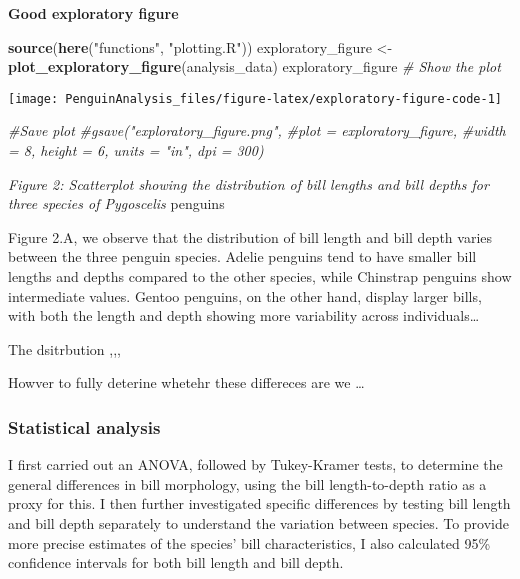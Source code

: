 \documentclass[
]{article}
\newenvironment{Shaded}{\begin{snugshade}}{\end{snugshade}}
\newcommand{\CommentTok}[1]{\textcolor[rgb]{0.56,0.35,0.01}{\textit{#1}}}
\newcommand{\FunctionTok}[1]{\textcolor[rgb]{0.13,0.29,0.53}{\textbf{#1}}}
\newcommand{\NormalTok}[1]{#1}
\newcommand{\OtherTok}[1]{\textcolor[rgb]{0.56,0.35,0.01}{#1}}
\newcommand{\StringTok}[1]{\textcolor[rgb]{0.31,0.60,0.02}{#1}}
\begin{document}
\textbf{Good exploratory figure}

\begin{Shaded}
\begin{Highlighting}[]
\FunctionTok{source}\NormalTok{(}\FunctionTok{here}\NormalTok{(}\StringTok{"functions"}\NormalTok{, }\StringTok{"plotting.R"}\NormalTok{))}
\NormalTok{exploratory\_figure }\OtherTok{\textless{}{-}} \FunctionTok{plot\_exploratory\_figure}\NormalTok{(analysis\_data)}
\NormalTok{exploratory\_figure }\CommentTok{\# Show the plot}
\end{Highlighting}
\end{Shaded}

\begin{center}\texttt{[image: PenguinAnalysis\_files/figure-latex/exploratory-figure-code-1]} \end{center}

\begin{Shaded}
\begin{Highlighting}[]
\CommentTok{\#Save plot }
\CommentTok{\#gsave("exploratory\_figure.png", }
       \CommentTok{\#plot = exploratory\_figure, }
       \CommentTok{\#width = 8, height = 6, units = "in", dpi = 300)  }
\end{Highlighting}
\end{Shaded}

\emph{Figure 2: Scatterplot showing the distribution of bill lengths and
bill depths for three species of Pygoscelis} penguins

Figure 2.A, we observe that the distribution of bill length and bill
depth varies between the three penguin species. Adelie penguins tend to
have smaller bill lengths and depths compared to the other species,
while Chinstrap penguins show intermediate values. Gentoo penguins, on
the other hand, display larger bills, with both the length and depth
showing more variability across individuals\ldots{}

The dsitrbution ,,,

Howver to fully deterine whetehr these differeces are we \ldots{}

\subsubsection{Statistical analysis}\label{statistical-analysis-1}

I first carried out an ANOVA, followed by Tukey-Kramer tests, to
determine the general differences in bill morphology, using the bill
length-to-depth ratio as a proxy for this. I then further investigated
specific differences by testing bill length and bill depth separately to
understand the variation between species. To provide more precise
estimates of the species' bill characteristics, I also calculated 95\%
confidence intervals for both bill length and bill depth.
\end{document}
